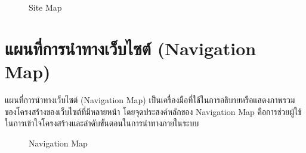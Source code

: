 \begin{figure}[H]\centering
    \setlength{\fboxrule}{0.2mm} %
    \setlength{\fboxsep}{0.5cm}
    \caption{Site Map}\label{fig:siteMap}
\end{figure}


\section{แผนที่การนำทางเว็บไซต์ (Navigation Map)}
แผนที่การนำทางเว็บไซต์ (Navigation Map) เป็นเครื่องมือที่ใช้ในการอธิบายหรือแสดงภาพรวมของโครงสร้างของเว็บไซต์ที่มีหลายหน้า โดยจุดประสงค์หลักของ Navigation Map คือการช่วยผู้ใช้ในการเข้าใจโครงสร้างและลำดับขั้นตอนในการนำทางภายในระบบ
\begin{figure}[H]\centering
    \setlength{\fboxrule}{0.2mm} %
    \setlength{\fboxsep}{0.5cm}
    \caption{Navigation Map}\label{fig:navMap}
\end{figure}
\newpage

